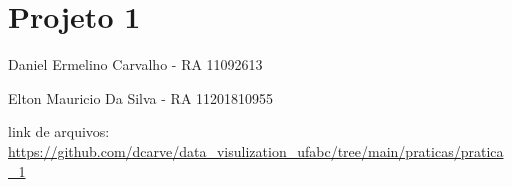 





\frenchspacing 


\textual

	

	\chapter{Projeto 1}
		Daniel Ermelino Carvalho - RA 11092613
		
		Elton Mauricio Da Silva - RA 11201810955

		link de arquivos:
		\url{https://github.com/dcarve/data_visulization_ufabc/tree/main/praticas/pratica_1}
	
	

	

	



\printindex




